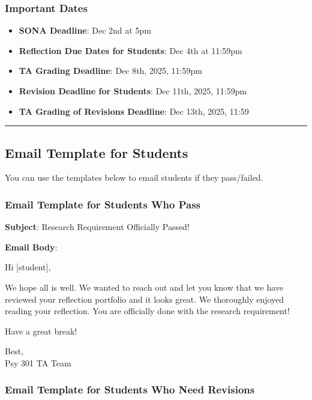\documentclass[
]{article}
\providecommand{\tightlist}{%
  \setlength{\itemsep}{0pt}\setlength{\parskip}{0pt}}
\begin{document}
\hypertarget{important-dates}{%
\subsubsection{Important Dates}\label{important-dates}}

\begin{itemize}
\tightlist
\item
  \textbf{SONA Deadline}: Dec 2nd at 5pm
\item
  \textbf{Reflection Due Dates for Students}: Dec 4th at 11:59pm
\item
  \textbf{TA Grading Deadline}: Dec 8th, 2025, 11:59pm
\item
  \textbf{Revision Deadline for Students}: Dec 11th, 2025, 11:59pm
\item
  \textbf{TA Grading of Revisions Deadline}: Dec 13th, 2025, 11:59
\end{itemize}

\begin{center}\rule{0.5\linewidth}{0.5pt}\end{center}

\hypertarget{email-template-for-students}{%
\subsection{Email Template for Students}\label{email-template-for-students}}

You can use the templates below to email students if they pass/failed.

\hypertarget{email-template-for-students-who-pass}{%
\subsubsection{Email Template for Students Who Pass}\label{email-template-for-students-who-pass}}

\textbf{Subject}: Research Requirement Officially Passed!

\textbf{Email Body}:

Hi {[}student{]},

We hope all is well. We wanted to reach out and let you know that we have reviewed your reflection portfolio and it looks great. We thoroughly enjoyed reading your reflection. You are officially done with the research requirement!

Have a great break!

Best,\\
Psy 301 TA Team

\hypertarget{email-template-for-students-who-need-revisions}{%
\subsubsection{Email Template for Students Who Need Revisions}\label{email-template-for-students-who-need-revisions}}
\end{document}
